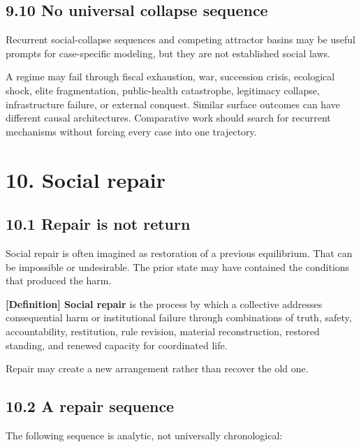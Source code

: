 \documentclass[
  11pt,
]{article}
\begin{document}
\subsection{9.10 No universal collapse
sequence}\label{no-universal-collapse-sequence}

Recurrent social-collapse sequences and competing attractor basins may
be useful prompts for case-specific modeling, but they are not
established social laws.

A regime may fail through fiscal exhaustion, war, succession crisis,
ecological shock, elite fragmentation, public-health catastrophe,
legitimacy collapse, infrastructure failure, or external conquest.
Similar surface outcomes can have different causal architectures.
Comparative work should search for recurrent mechanisms without forcing
every case into one trajectory.

\section{10. Social repair}\label{social-repair}

\subsection{10.1 Repair is not return}\label{repair-is-not-return}

Social repair is often imagined as restoration of a previous
equilibrium. That can be impossible or undesirable. The prior state may
have contained the conditions that produced the harm.

\textbf{{[}Definition{]} Social repair} is the process by which a
collective addresses consequential harm or institutional failure through
combinations of truth, safety, accountability, restitution, rule
revision, material reconstruction, restored standing, and renewed
capacity for coordinated life.

Repair may create a new arrangement rather than recover the old one.

\subsection{10.2 A repair sequence}\label{a-repair-sequence}

The following sequence is analytic, not universally chronological:
\end{document}
